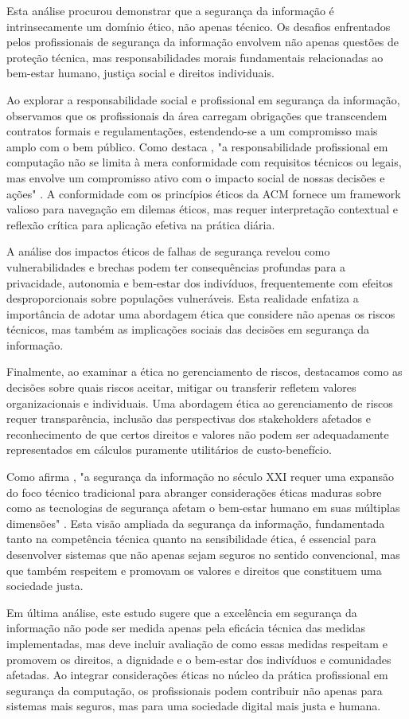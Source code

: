 Esta análise procurou demonstrar que a segurança da informação é intrinsecamente um domínio ético, não apenas técnico. Os desafios enfrentados pelos profissionais de segurança da informação envolvem não apenas questões de proteção técnica, mas responsabilidades morais fundamentais relacionadas ao bem-estar humano, justiça social e direitos individuais.

Ao explorar a responsabilidade social e profissional em segurança da informação, observamos que os profissionais da área carregam obrigações que transcendem contratos formais e regulamentações, estendendo-se a um compromisso mais amplo com o bem público. Como destaca \citeauthor{gotterbarn1999not}, "a responsabilidade profissional em computação não se limita à mera conformidade com requisitos técnicos ou legais, mas envolve um compromisso ativo com o impacto social de nossas decisões e ações" \cite{gotterbarn1999not}. A conformidade com os princípios éticos da ACM fornece um framework valioso para navegação em dilemas éticos, mas requer interpretação contextual e reflexão crítica para aplicação efetiva na prática diária.

A análise dos impactos éticos de falhas de segurança revelou como vulnerabilidades e brechas podem ter consequências profundas para a privacidade, autonomia e bem-estar dos indivíduos, frequentemente com efeitos desproporcionais sobre populações vulneráveis. Esta realidade enfatiza a importância de adotar uma abordagem ética que considere não apenas os riscos técnicos, mas também as implicações sociais das decisões em segurança da informação.

Finalmente, ao examinar a ética no gerenciamento de riscos, destacamos como as decisões sobre quais riscos aceitar, mitigar ou transferir refletem valores organizacionais e individuais. Uma abordagem ética ao gerenciamento de riscos requer transparência, inclusão das perspectivas dos stakeholders afetados e reconhecimento de que certos direitos e valores não podem ser adequadamente representados em cálculos puramente utilitários de custo-benefício.

Como afirma \citeauthor{acquisti2015privacy}, "a segurança da informação no século XXI requer uma expansão do foco técnico tradicional para abranger considerações éticas maduras sobre como as tecnologias de segurança afetam o bem-estar humano em suas múltiplas dimensões" \cite{acquisti2015privacy}. Esta visão ampliada da segurança da informação, fundamentada tanto na competência técnica quanto na sensibilidade ética, é essencial para desenvolver sistemas que não apenas sejam seguros no sentido convencional, mas que também respeitem e promovam os valores e direitos que constituem uma sociedade justa.

Em última análise, este estudo sugere que a excelência em segurança da informação não pode ser medida apenas pela eficácia técnica das medidas implementadas, mas deve incluir avaliação de como essas medidas respeitam e promovem os direitos, a dignidade e o bem-estar dos indivíduos e comunidades afetadas. Ao integrar considerações éticas no núcleo da prática profissional em segurança da computação, os profissionais podem contribuir não apenas para sistemas mais seguros, mas para uma sociedade digital mais justa e humana. 
